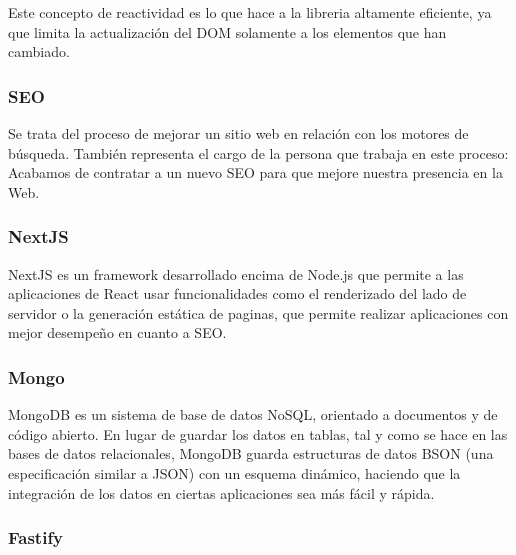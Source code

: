        Este concepto de reactividad es lo que hace a la libreria altamente eficiente, ya que limita la actualización del DOM solamente a los elementos que han cambiado.
        
    \subsubsection{SEO}
    
        Se trata del proceso de mejorar un sitio web en relación con los motores de búsqueda. También representa el cargo de la persona que trabaja en este proceso: Acabamos de contratar a un nuevo SEO para que mejore nuestra presencia en la Web.

    \subsubsection{NextJS}

        NextJS es un framework desarrollado encima de Node.js que permite a las aplicaciones de React usar funcionalidades como el renderizado del lado de servidor o la generación estática de paginas, que permite realizar aplicaciones con mejor desempeño en cuanto a SEO.


    \subsubsection{Mongo}

        MongoDB es un sistema de base de datos NoSQL, orientado a documentos y de código abierto. En lugar de guardar los datos en tablas, tal y como se hace en las bases de datos relacionales, MongoDB guarda estructuras de datos BSON (una especificación similar a JSON) con un esquema dinámico, haciendo que la integración de los datos en ciertas aplicaciones sea más fácil y rápida.

        \iffalse 
            \begin{figure}
                \texttt{[image: mongodb-structure.jpg]}
                \caption{Comparación de estructura de datos entre MongoDB y los RDBMS (sistema de gestión de bases de datos relacionales)}
            \end{figure}
        \fi

    \subsubsection{Fastify}



